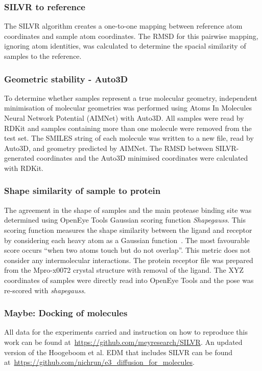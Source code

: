 \documentclass[journal=jacsat,manuscript=article]{achemso}
\begin{document}
\subsubsection{SILVR to reference}
The SILVR algorithm creates a one-to-one mapping between reference atom coordinates and sample atom coordinates. The RMSD for this pairwise mapping, ignoring atom identities, was calculated to determine the spacial similarity of samples to the reference. 

\subsubsection{Geometric stability - Auto3D}
To determine whether samples represent a true molecular geometry, independent minimisation of molecular geometries was performed using Atoms In Molecules Neural Network Potential (AIMNet) with Auto3D. All samples were read by RDKit and samples containing more than one molecule were removed from the test set. The SMILES string of each molecule was written to a new file, read by Auto3D, and geometry predicted by AIMNet. The RMSD between SILVR-generated coordinates and the Auto3D minimised coordinates were calculated with RDKit.

\subsubsection{Shape similarity of sample to protein}
The agreement in the shape of samples and the main protease binding site was determined using OpenEye Tools Gaussian scoring function \textit{Shapegauss}. This scoring function measures the shape similarity between the ligand and receptor by considering each heavy atom as a Gaussian function~\cite{mcgann2003gaussian}. The most favourable score occurs “when two atoms touch but do not overlap”.  This metric does not consider any intermolecular interactions. The protein receptor file was prepared from the Mpro-x0072 crystal structure with removal of the ligand. The XYZ coordinates of samples were directly read into OpenEye Tools and the pose was re-scored with \textit{shapegauss}. 

\subsubsection{Maybe: Docking of molecules}

All data for the experiments carried and instruction on how to reproduce this work can be found at~\url{https://github.com/meyresearch/SILVR}. An updated version of the Hoogeboom et al. EDM that includes SILVR can be found at~\url{https://github.com/nichrun/e3_diffusion_for_molecules}.
\end{document}
